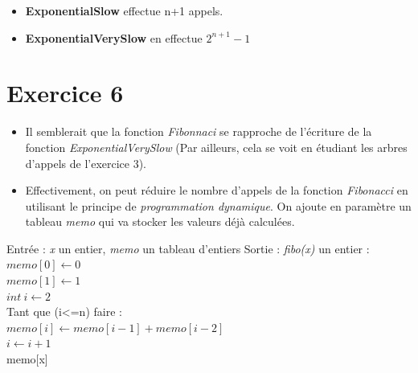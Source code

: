 \documentclass{article}
\begin{document}
\begin{itemize}
    \item \textbf{ExponentialSlow} effectue n+1 appels.
    \item \textbf{ExponentialVerySlow} en effectue $ 2^{n+1} -1 $
\end{itemize}

\section*{Exercice 6}

\begin{itemize}
    \item Il semblerait que la fonction \textit{Fibonnaci} se rapproche de l'écriture de la fonction \textit{ExponentialVerySlow} (Par ailleurs, cela se voit en étudiant les arbres d'appels de l'exercice 3).
    \item Effectivement, on peut réduire le nombre d'appels de la fonction \textit{Fibonacci} en utilisant le principe de \textit{programmation dynamique}.
        \subitem On ajoute en paramètre un tableau \textit{memo} qui va stocker les valeurs déjà calculées. 
\end{itemize}

\begin{algorithm}
    \caption{Fibonnaci par programmation dynamique}
    \begin{algorithmic}[1]
        \State Entrée : \textit{x} un entier, \textit{memo} un tableau d'entiers
        \State Sortie : \textit{fibo(x)} un entier
         :
            \\
            \quad $ memo[0] \leftarrow 0$
            \\
            \quad $ memo[1] \leftarrow 1$
            \\
            \quad $ int~i \leftarrow 2$
            \\
            \quad Tant que (i<=n) faire :
            \\
            \quad \quad $ memo[i] \leftarrow {memo[i-1] + memo[i-2]}$
            \\
            \quad \quad $ i \leftarrow {i + 1}$
            \\
            \quad \Return memo[x]
        \EndFunction
    \end{algorithmic}
\end{algorithm}
\end{document}
